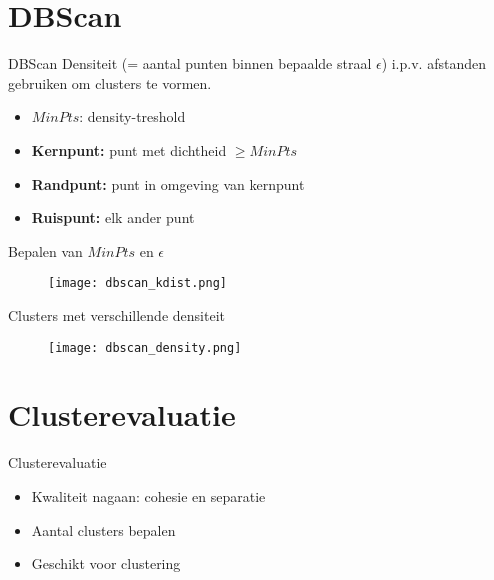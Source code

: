 \documentclass{beamer}
\begin{document}
\section{DBScan}
\begin{frame}{DBScan}
 Densiteit (= aantal punten binnen bepaalde straal $\epsilon$) i.p.v.
 afstanden gebruiken om clusters te vormen.
 \begin{itemize}
  \item $MinPts$: density-treshold
  \item \textbf{Kernpunt:} punt met dichtheid $\geq MinPts$
  \item \textbf{Randpunt:} punt in omgeving van kernpunt
  \item \textbf{Ruispunt:} elk ander punt
 \end{itemize}

\end{frame}

\begin{frame}
 Bepalen van $MinPts$ en $\epsilon$
 \begin{figure}[!ht]\centering
  \texttt{[image: dbscan\_kdist.png]}
 \end{figure}

\end{frame}
 
 
 
\begin{frame}
 Clusters met verschillende densiteit
 \begin{figure}[!ht]\centering
  \texttt{[image: dbscan\_density.png]}
 \end{figure}

\end{frame}

\section{Clusterevaluatie}
\begin{frame}{Clusterevaluatie}
 \begin{itemize}
  \item Kwaliteit nagaan: cohesie en separatie
  \item Aantal clusters bepalen
  \item Geschikt voor clustering
 \end{itemize}

\end{frame}
\end{document}
